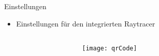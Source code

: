 \documentclass[final,hyperref={pdfpagelabels=false}]{beamer}
\begin{document}
\begin{frame}[t]
\begin{columns}[t]
\begin{column}{.465\textwidth}
\begin{block}{Einstellungen}
   
   
   
   
   
   \begin{itemize}
   \item Einstellungen für den integrierten Raytracer
   \end{itemize}
   
     
   
   
\end{block}


\end{column} %



\begin{column}{.025\textwidth}\end{column} %

\end{columns} %











\begin{columns}

\begin{column}{0.02\textwidth}\end{column} %

\begin{column}{0.15\textwidth}
\begin{figure}[h]
\centering
\texttt{[image: qrCode]}
\end{figure}
\end{column}

\begin{column}{0.01\textwidth}\end{column} %


\end{columns}
\end{frame}
\end{document}
